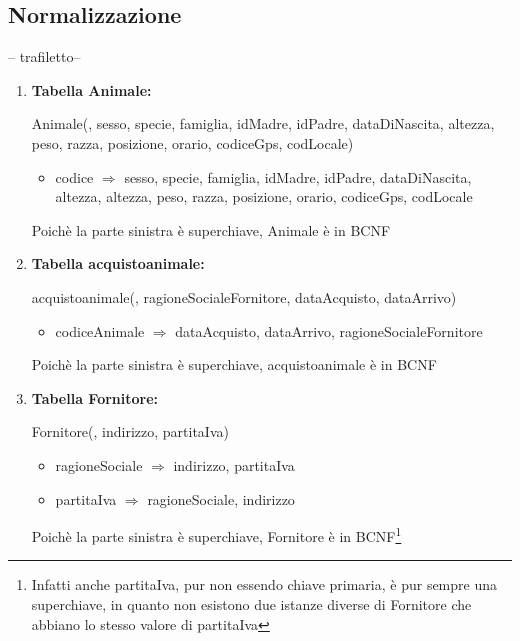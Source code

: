 \documentclass[12pt,a4paper]{article}
\begin{document}
\subsection{Normalizzazione}
-- trafiletto--
\begin{enumerate}



\item[] \textbf{Tabella Animale:}

Animale(\underline{}, sesso, specie, famiglia, idMadre, idPadre, dataDiNascita, altezza, peso, razza, posizione, orario,  codiceGps,  codLocale)
\begin{itemize}
\vspace{-5pt}
\item codice $\Rightarrow$ sesso, specie, famiglia, idMadre, idPadre, dataDiNascita, altezza, altezza, peso, razza, posizione, orario, codiceGps, codLocale
\vspace{-5pt}
\end{itemize}
Poichè la parte sinistra è superchiave, Animale è in BCNF
\vspace{10pt}



\item[] \textbf{Tabella acquistoanimale:}

acquistoanimale(\underline{}, ragioneSocialeFornitore,  dataAcquisto,  dataArrivo)
\begin{itemize}
\vspace{-5pt}
\item codiceAnimale $\Rightarrow$ dataAcquisto, dataArrivo, ragioneSocialeFornitore
\vspace{-5pt}
\end{itemize}
Poichè la parte sinistra è superchiave, acquistoanimale è in BCNF
\vspace{10pt}



\item[] \textbf{Tabella Fornitore:}

Fornitore(\underline{}, indirizzo, partitaIva)
\begin{itemize}
\vspace{-5pt}
\item ragioneSociale $\Rightarrow$ indirizzo, partitaIva
\item partitaIva $\Rightarrow$ ragioneSociale, indirizzo
\vspace{-5pt}
\end{itemize}
Poichè la parte sinistra è superchiave, Fornitore è in BCNF\footnote{Infatti anche partitaIva, pur non essendo chiave primaria, è pur sempre una superchiave, in quanto non esistono due  istanze diverse di Fornitore che abbiano lo stesso valore di partitaIva}
\vspace{10pt}




\end{enumerate}
\end{document}
